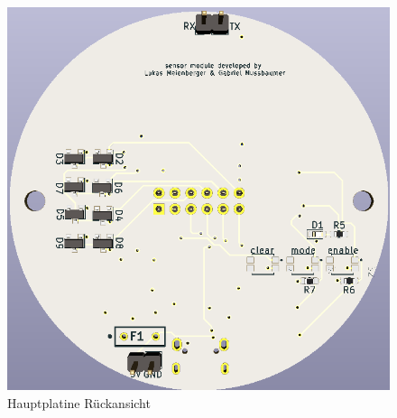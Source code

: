 \begin{figure}[h!]
\begin{minipage}[t]{0.4\linewidth}
		\includegraphics[width=1\textwidth]{graphics/Hauptplatine_hinten.png}
		\caption{Hauptplatine Rückansicht}
		\label{pic: Hauptplatine_hinten}
	\end{minipage}
\end{figure}


